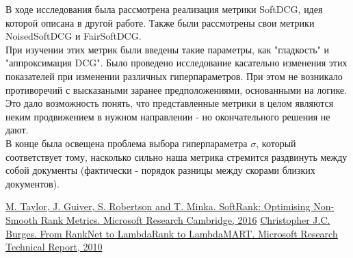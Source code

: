 \documentclass[14pt,a4paper]{amsart}
\theoremstyle{definition}
\theoremstyle{definition}
\begin{document}
В ходе исследования была рассмотрена реализация метрики SoftDCG, идея которой описана в другой работе. Также были рассмотрены свои метрики NoisedSoftDCG и FairSoftDCG. \\

При изучении этих метрик были введены такие параметры, как "гладкость" и "аппроксимация DCG". Было проведено исследование касательно изменения этих показателей при изменении различных гиперпараметров. При этом не возникало противоречий с высказаными заранее предположениями, основанными на логике. Это дало возможность понять, что представленные метрики в целом являются неким продвижением в нужном направлении - но окончательного решения не дают. \\

В конце была освещена проблема выбора гиперпараметра $\sigma$, который соответствует тому, насколько сильно наша метрика стремится раздвинуть между собой документы (фактически - порядок разницы между скорами близких документов). 


\newpage

\begin{thebibliography}{1}

 \href{https://www.microsoft.com/en-us/research/publication/softrank-optimising-non-smooth-rank-metrics/}
{M. Taylor, J. Guiver, S. Robertson and T. Minka. SoftRank: Optimising Non-Smooth Rank Metrics. Microsoft Research Cambridge, 2016}
 \href{https://www.microsoft.com/en-us/research/publication/from-ranknet-to-lambdarank-to-lambdamart-an-overview/}
{Christopher J.C. Burges. From RankNet to LambdaRank to LambdaMART. Microsoft Research Technical Report, 2010}

\end{thebibliography}

\vspace{0.7cm}
\end{document}
